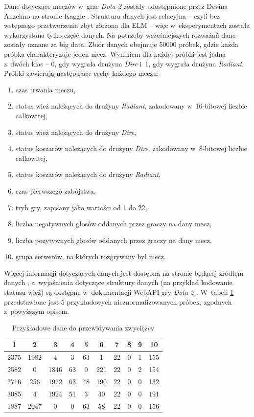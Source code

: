 \documentclass[pl]{minipw} %
\begin{document}
Dane dotyczące meczów w~grze \textit{Dota 2} zostały udostępnione przez Devina Anzelmo na stronie Kaggle \cite{dota2}. Struktura danych jest relacyjna -- czyli bez wstępnego przetworzenia zbyt złożona dla ELM -- więc w~eksperymentach została wykorzystana tylko część danych. Na potrzeby wcześniejszych rozważań dane zostały uznane za big data. Zbiór danych obejmuje 50000 próbek, gdzie każda próbka charakteryzuje jeden mecz. Wynikiem dla każdej próbki jest jedna z~dwóch klas -- 0, gdy wygrała drużyna \textit{Dire} i~1, gdy wygrała drużyna \textit{Radiant}. Próbki zawierają następujące cechy każdego meczu:
\begin{enumerate}
\item czas trwania meczu,
\item status wież należących do drużyny \textit{Radiant}, zakodowany w~16-bitowej liczbie całkowitej,
\item status wież należących do drużyny \textit{Dire},
\item status koszarów należących do drużyny \textit{Dire}, zakodowany w~8-bitowej liczbie całkowitej,
\item status koszarów należących do drużyny \textit{Radiant},
\item czas pierwszego zabójstwa,
\item tryb gry, zapisany jako wartości od 1 do 22,
\item liczba negatywnych głosów oddanych przez graczy na dany mecz,
\item liczba pozytywnych głosów oddanych przez graczy na dany mecz,
\item grupa serwerów, na których rozgrywany był mecz.
\end{enumerate}
Więcej informacji dotyczących danych jest dostępna na stronie będącej źródłem danych \cite{dota2}, a~wyjaśnienia dotyczące struktury danych (na przykład kodowanie statusu wież) są dostępne w~dokumentacji WebAPI gry \textit{Dota 2} \cite{dota2_webapi}. W~tabeli \ref{dota2_first_5} przedstawione jest 5 przykładowych nieznormalizowanych próbek, zgodnych z~powyższym opisem.
\begin{table}[H]
\caption{Przykładowe dane do przewidywania zwycięzcy}
\label{dota2_first_5}
\centering
\begin{tabular}{|c|c|c|c|c|c|c|c|c|c|}
\hline
\textbf{1} & \textbf{2} & \textbf{3} & \textbf{4} & \textbf{5} & \textbf{6} & \textbf{7} & \textbf{8} & \textbf{9} & \textbf{10} \\
\hline
2375 & 1982 & 4 & 3 & 63 & 1 & 22 & 0 & 1 & 155 \\
2582 & 0 & 1846 & 63 & 0 & 221 & 22 & 0 & 2 & 154 \\
2716 & 256 & 1972 & 63 & 48 & 190 & 22 & 0 & 0 & 132 \\
3085 & 4 & 1924 & 51 & 3 & 40 & 22 & 0 & 0 & 191 \\
1887 & 2047 & 0 & 0 & 63 & 58 & 22 & 0 & 0 & 156 \\
\hline
\end{tabular}
\end{table}
\end{document}
